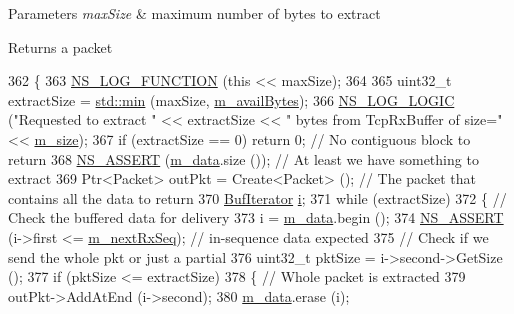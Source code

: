 \begin{DoxyParams}{Parameters}
{\em max\+Size} & maximum number of bytes to extract \\
\hline
\end{DoxyParams}
\begin{DoxyReturn}{Returns}
a packet 
\end{DoxyReturn}

\begin{DoxyCode}
362 \{
363   \hyperlink{log-macros-disabled_8h_a90b90d5bad1f39cb1b64923ea94c0761}{NS\_LOG\_FUNCTION} (\textcolor{keyword}{this} << maxSize);
364 
365   uint32\_t extractSize = \hyperlink{80211b_8c_ac6afabdc09a49a433ee19d8a9486056d}{std::min} (maxSize, \hyperlink{classns3_1_1TcpRxBuffer_a700ba510c9ea3ef08f11baf0de7244dc}{m\_availBytes});
366   \hyperlink{group__logging_ga88acd260151caf2db9c0fc84997f45ce}{NS\_LOG\_LOGIC} (\textcolor{stringliteral}{"Requested to extract "} << extractSize << \textcolor{stringliteral}{" bytes from TcpRxBuffer of size="} <<
       \hyperlink{classns3_1_1TcpRxBuffer_ad76a9d93027823422039c92e85d5d4ea}{m\_size});
367   \textcolor{keywordflow}{if} (extractSize == 0) \textcolor{keywordflow}{return} 0;  \textcolor{comment}{// No contiguous block to return}
368   \hyperlink{assert_8h_a6dccdb0de9b252f60088ce281c49d052}{NS\_ASSERT} (\hyperlink{classns3_1_1TcpRxBuffer_a695c34ebc7bd328b49c507f101257aed}{m\_data}.size ()); \textcolor{comment}{// At least we have something to extract}
369   Ptr<Packet> outPkt = Create<Packet> (); \textcolor{comment}{// The packet that contains all the data to return}
370   \hyperlink{classns3_1_1TcpRxBuffer_a6d8a168521cf993cc3dec893067dcb62}{BufIterator} \hyperlink{bernuolliDistribution_8m_a6f6ccfcf58b31cb6412107d9d5281426}{i};
371   \textcolor{keywordflow}{while} (extractSize)
372     \{ \textcolor{comment}{// Check the buffered data for delivery}
373       i = \hyperlink{classns3_1_1TcpRxBuffer_a695c34ebc7bd328b49c507f101257aed}{m\_data}.begin ();
374       \hyperlink{assert_8h_a6dccdb0de9b252f60088ce281c49d052}{NS\_ASSERT} (i->first <= \hyperlink{classns3_1_1TcpRxBuffer_ab4390502dee7085dad4f7c3f9ef8796b}{m\_nextRxSeq}); \textcolor{comment}{// in-sequence data expected}
375       \textcolor{comment}{// Check if we send the whole pkt or just a partial}
376       uint32\_t pktSize = i->second->GetSize ();
377       \textcolor{keywordflow}{if} (pktSize <= extractSize)
378         \{ \textcolor{comment}{// Whole packet is extracted}
379           outPkt->AddAtEnd (i->second);
380           \hyperlink{classns3_1_1TcpRxBuffer_a695c34ebc7bd328b49c507f101257aed}{m\_data}.erase (i);

\end{DoxyCode}
